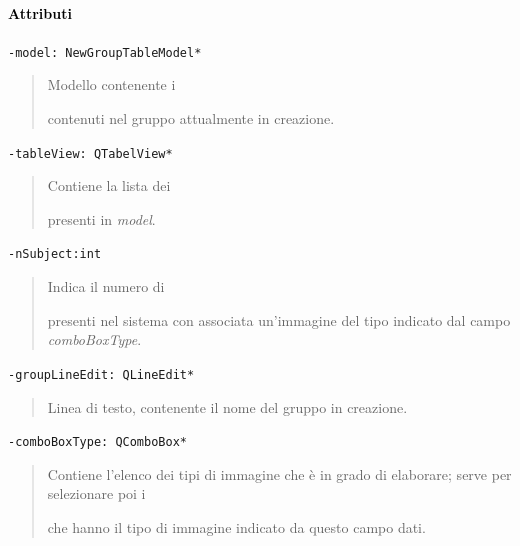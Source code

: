 \paragraph{\textcolor{black}{Attributi\\}}
\color{teal}\verb!-model: NewGroupTableModel* !
\color{black}
\begin{quote} Modello contenente i \subject{} contenuti nel gruppo attualmente in creazione.
\end{quote}
\color{teal}\verb!-tableView: QTabelView* !
\color{black}
\begin{quote} Contiene la lista dei \subject{} presenti in \emph{model}.
\end{quote}
\color{teal}\verb!-nSubject:int !
\color{black}
\begin{quote}Indica il numero di \subject{} presenti nel sistema con associata un'immagine del tipo indicato dal campo \emph{comboBoxType}.
\end{quote}

\color{teal}\verb!-groupLineEdit: QLineEdit* !
\color{black}
\begin{quote} Linea di testo, contenente il nome del gruppo in creazione.
\end{quote}
\color{teal}\verb!-comboBoxType: QComboBox* !
\color{black}
\begin{quote}Contiene l'elenco dei tipi di immagine che \project è in grado di elaborare; serve per selezionare poi i \subject{} che hanno il tipo di immagine indicato da questo campo dati.
\end{quote}
